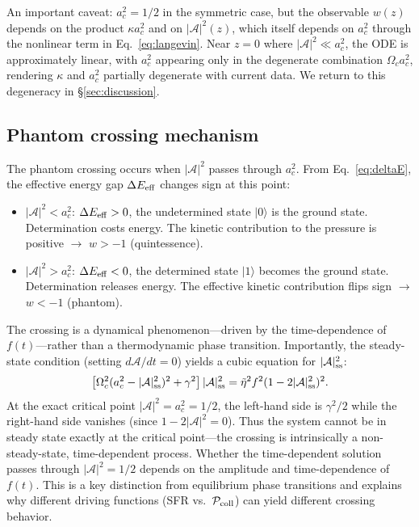 \documentclass[aps,prd,twocolumn,superscriptaddress]{revtex4-2}
\begin{document}
An important caveat: $a_c^2 = 1/2$ in the symmetric case, but the observable $w(z)$ depends on the product $\kappa a_c^2$ and on $|\mathcal{A}|^2(z)$, which itself depends on $a_c^2$ through the nonlinear term in Eq.~\eqref{eq:langevin}. Near $z=0$ where $|\mathcal{A}|^2 \ll a_c^2$, the ODE is approximately linear, with $a_c^2$ appearing only in the degenerate combination $\Omega_c a_c^2$, rendering $\kappa$ and $a_c^2$ partially degenerate with current data. We return to this degeneracy in \S\ref{sec:discussion}.

\subsection{Phantom crossing mechanism}

The phantom crossing occurs when $|\mathcal{A}|^2$ passes through $a_c^2$. From Eq.~\eqref{eq:deltaE}, the effective energy gap $\Delta E_{\rm eff}$ changes sign at this point:

\begin{itemize}
\item $|\mathcal{A}|^2 < a_c^2$: $\Delta E_{\rm eff} > 0$, the undetermined state $|0\rangle$ is the ground state. Determination costs energy. The kinetic contribution to the pressure is positive $\to$ $w > -1$ (quintessence).
\item $|\mathcal{A}|^2 > a_c^2$: $\Delta E_{\rm eff} < 0$, the determined state $|1\rangle$ becomes the ground state. Determination releases energy. The effective kinetic contribution flips sign $\to$ $w < -1$ (phantom).
\end{itemize}

The crossing is a dynamical phenomenon---driven by the time-dependence of $f(t)$---rather than a thermodynamic phase transition. Importantly, the steady-state condition (setting $d\mathcal{A}/dt = 0$) yields a cubic equation for $|\mathcal{A}|^2_{\rm ss}$:
\begin{equation}
\left[\Omega_c^2(a_c^2 - |\mathcal{A}|^2_{\rm ss})^2 + \gamma^2\right]|\mathcal{A}|^2_{\rm ss} = \tilde{\eta}^2 f^2 (1-2|\mathcal{A}|^2_{\rm ss})^2.
\label{eq:steady_cubic}
\end{equation}
At the exact critical point $|\mathcal{A}|^2 = a_c^2 = 1/2$, the left-hand side is $\gamma^2/2$ while the right-hand side vanishes (since $1-2|\mathcal{A}|^2 = 0$). Thus the system cannot be in steady state exactly at the critical point---the crossing is intrinsically a non-steady-state, time-dependent process. Whether the time-dependent solution passes through $|\mathcal{A}|^2 = 1/2$ depends on the amplitude and time-dependence of $f(t)$. This is a key distinction from equilibrium phase transitions and explains why different driving functions (SFR vs.\ $\mathcal{P}_{\rm coll}$) can yield different crossing behavior.
\end{document}
